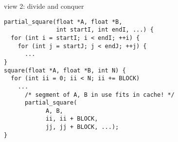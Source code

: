 
\begin{frame}[fragile,label=cacheDivideConquer]{view 2: divide and conquer}
\lstset{style=small}
\begin{lstlisting}
partial_square(float *A, float *B,
               int startI, int endI, ...) {
  for (int i = startI; i < endI; ++i) {
    for (int j = startJ; j < endJ; ++j) {
      ...
}
square(float *A, float *B, int N) {
  for (int ii = 0; ii < N; ii += BLOCK)
    ...
      /* segment of A, B in use fits in cache! */
      partial_square(
            A, B,
            ii, ii + BLOCK,
            jj, jj + BLOCK, ...);
}
\end{lstlisting}
\end{frame}
